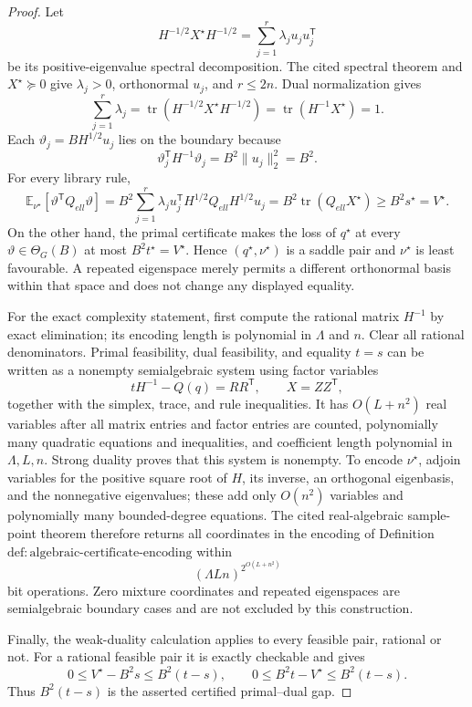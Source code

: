 \documentclass{article}
\begin{document}
\begin{proof}
Let
\[
 H^{-1/2}X^{\star}H^{-1/2}
 =\sum_{j=1}^{r}\lambda_ju_ju_j^{\mathsf T}
\]
be its positive-eigenvalue spectral decomposition.  The cited spectral theorem and \(X^{\star}\succeq0\) give \(\lambda_j>0\), orthonormal \(u_j\), and \(r\le2n\).  Dual normalization gives
\[
 \sum_{j=1}^r\lambda_j
 =\operatorname{tr}(H^{-1/2}X^{\star}H^{-1/2})
 =\operatorname{tr}(H^{-1}X^{\star})=1.
\]
Each \(\vartheta_j=BH^{1/2}u_j\) lies on the boundary because
\[
 \vartheta_j^{\mathsf T}H^{-1}\vartheta_j=B^2\|u_j\|_2^2=B^2.
\]
For every library rule,
\[
 \mathbb E_{\nu^{\star}}[\vartheta^{\mathsf T}Q_{ell}\vartheta]
 =B^2\sum_{j=1}^r\lambda_ju_j^{\mathsf T}H^{1/2}Q_{ell}H^{1/2}u_j
 =B^2\operatorname{tr}(Q_{ell}X^{\star})
 \ge B^2s^{\star}=V^{\star}.
\]
On the other hand, the primal certificate makes the loss of \(q^{\star}\) at every \(\vartheta\in\Theta_G(B)\) at most \(B^2t^{\star}=V^{\star}\).  Hence \((q^{\star},\nu^{\star})\) is a saddle pair and \(\nu^{\star}\) is least favourable.  A repeated eigenspace merely permits a different orthonormal basis within that space and does not change any displayed equality.

For the exact complexity statement, first compute the rational matrix \(H^{-1}\) by exact elimination; its encoding length is polynomial in \(\Lambda\) and \(n\).  Clear all rational denominators.  Primal feasibility, dual feasibility, and equality \(t=s\) can be written as a nonempty semialgebraic system using factor variables
\[
 tH^{-1}-Q(q)=RR^{\mathsf T},
 \qquad
 X=ZZ^{\mathsf T},
\]
together with the simplex, trace, and rule inequalities.  It has \(O(L+n^2)\) real variables after all matrix entries and factor entries are counted, polynomially many quadratic equations and inequalities, and coefficient length polynomial in \(\Lambda,L,n\).  Strong duality proves that this system is nonempty.  To encode \(\nu^{\star}\), adjoin variables for the positive square root of \(H\), its inverse, an orthogonal eigenbasis, and the nonnegative eigenvalues; these add only \(O(n^2)\) variables and polynomially many bounded-degree equations.  The cited real-algebraic sample-point theorem therefore returns all coordinates in the encoding of Definition \(\mathrm{def:algebraic\mbox{-}certificate\mbox{-}encoding}\) within
\[
 (\Lambda Ln)^{2^{O(L+n^2)}}
\]
bit operations.  Zero mixture coordinates and repeated eigenspaces are semialgebraic boundary cases and are not excluded by this construction.

Finally, the weak-duality calculation applies to every feasible pair, rational or not.  For a rational feasible pair it is exactly checkable and gives
\[
 0\le V^{\star}-B^2s\le B^2(t-s),
 \qquad
 0\le B^2t-V^{\star}\le B^2(t-s).
\]
Thus \(B^2(t-s)\) is the asserted certified primal--dual gap.
\end{proof}
\end{document}
